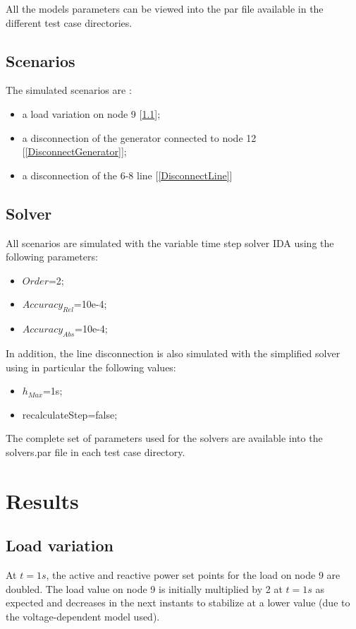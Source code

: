 \documentclass[a4paper, 12pt]{report}
\begin{document}
All the models parameters can be viewed into the par file available in the different test case directories.

\subsection{Scenarios}
The simulated scenarios are :
\begin{itemize}
\item a load variation on node 9 [\ref{LoadVariation}];
\item a disconnection of the generator connected to node 12 [\ref{DisconnectGenerator}];
\item a disconnection of the 6-8 line [\ref{DisconnectLine}]
\end{itemize}

\subsection{Solver}
All scenarios are simulated with the variable time step solver IDA using the following parameters:
\begin{itemize}
\item $Order$=2;
\item $Accuracy_{Rel}$=10e-4;
\item $Accuracy_{Abs}$=10e-4;
\end{itemize}

In addition, the line disconnection is also simulated with the simplified solver using in particular the following values:
\begin{itemize}
\item $h_{Max}$=1s;
\item recalculateStep=false;
\end{itemize}

The complete set of parameters used for the solvers are available into the solvers.par file in each test case directory.

\newpage
\section{Results}

\subsection{Load variation}
\label{LoadVariation}

At $t=1s$, the active and reactive power set points for the load on node 9 are doubled. The load value on node 9 is initially multiplied by 2 at $t=1s$ as expected and decreases in the next instants to stabilize at a lower value (due to the voltage-dependent model used). \\
\end{document}
